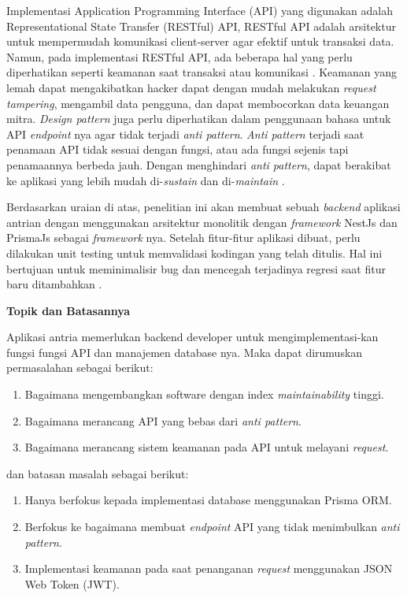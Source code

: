 Implementasi Application Programming Interface (API) yang digunakan adalah Representational State Transfer (RESTful) API, RESTful API adalah arsitektur untuk mempermudah komunikasi client-server agar efektif untuk transaksi data. Namun, pada implementasi RESTful API, ada beberapa hal yang perlu diperhatikan seperti keamanan saat transaksi  atau komunikasi \cite{Beer2018}. Keamanan yang lemah dapat mengakibatkan hacker dapat dengan mudah melakukan \textit{request tampering}, mengambil data pengguna, dan dapat membocorkan data keuangan mitra. \textit{Design pattern} juga perlu diperhatikan dalam penggunaan bahasa untuk API \textit{endpoint} nya agar tidak terjadi \textit{anti pattern}. \textit{Anti pattern} terjadi saat penamaan API tidak sesuai dengan fungsi, atau ada fungsi sejenis tapi penamaannya berbeda jauh. Dengan menghindari \textit{anti pattern}, dapat berakibat ke aplikasi yang lebih mudah di-\textit{sustain} dan di-\textit{maintain} \cite{Aghajani2018} \cite{Alshraiedeh2021}.

Berdasarkan uraian di atas, penelitian ini akan membuat sebuah \textit{backend} aplikasi antrian dengan menggunakan arsitektur monolitik dengan \textit{framework} NestJs dan PrismaJs sebagai \textit{framework} nya. Setelah fitur-fitur aplikasi dibuat, perlu dilakukan unit testing untuk memvalidasi kodingan yang telah ditulis. Hal ini bertujuan untuk meminimalisir bug dan mencegah terjadinya regresi saat fitur baru ditambahkan \cite{runeson2006survey}.

\noindent\textbf{Topik dan Batasannya}

Aplikasi antria memerlukan backend developer untuk mengimplementasi-kan fungsi fungsi API dan manajemen database nya. Maka dapat dirumuskan permasalahan sebagai berikut:
\begin{enumerate}
  \item Bagaimana mengembangkan software dengan index \textit{maintainability} tinggi.
  \item Bagaimana merancang API yang bebas dari \textit{anti pattern}.
  \item Bagaimana merancang sistem keamanan pada API untuk melayani \textit{request}.
\end{enumerate}
dan batasan masalah sebagai berikut:
\begin{enumerate}
  \item Hanya berfokus kepada implementasi database menggunakan Prisma ORM.
  \item Berfokus ke bagaimana membuat \textit{endpoint} API yang tidak menimbulkan \textit{anti pattern}.
  \item Implementasi keamanan pada saat penanganan \textit{request} menggunakan JSON Web Token (JWT).
\end{enumerate}


